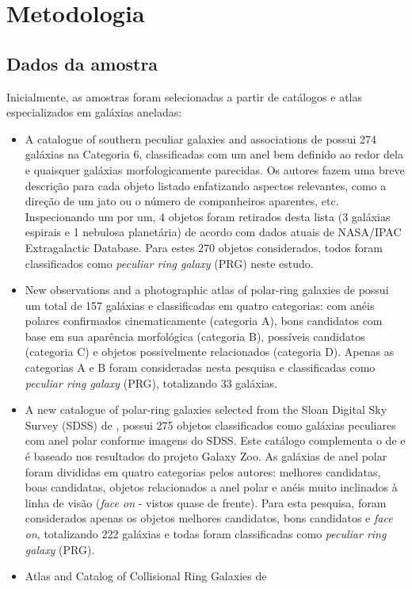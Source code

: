 \chapter{Metodologia}

\section{Dados da amostra}

Inicialmente, as amostras foram selecionadas a partir de catálogos e atlas especializados em galáxias aneladas:

\begin{itemize}
    \item A catalogue of southern peculiar galaxies and associations de  possui 274 galáxias na Categoria 6, classificadas com um anel bem definido ao redor dela e quaisquer galáxias morfologicamente parecidas. Os autores fazem uma breve descrição para cada objeto listado enfatizando aspectos relevantes, como a direção de um jato ou o número de companheiros aparentes, etc. Inspecionando um por um, 4 objetos foram retirados desta lista (3 galáxias espirais e 1 nebulosa planetária) de acordo com dados atuais de NASA/IPAC Extragalactic Database. Para estes 270 objetos considerados, todos foram classificados como \emph{peculiar ring galaxy} (PRG) neste estudo.
    \item New observations and a photographic atlas of polar-ring galaxies de  possui um total de 157 galáxias e classificadas em quatro categorias: com anéis polares confirmados cinematicamente (categoria A), bons candidatos com base em sua aparência morfológica (categoria B), possíveis candidatos (categoria C) e objetos possivelmente relacionados (categoria D). Apenas as categorias A e B foram consideradas nesta pesquisa e classificadas como \emph{peculiar ring galaxy} (PRG), totalizando 33 galáxias.
    \item A new catalogue of polar-ring galaxies selected from the Sloan Digital Sky Survey (SDSS) de , possui 275 objetos classificados como galáxias peculiares com anel polar conforme imagens do SDSS. Este catálogo complementa o de  e é baseado nos resultados do projeto Galaxy Zoo. As galáxias de anel polar foram divididas em quatro categorias pelos autores: melhores candidatas, boas candidatas, objetos relacionados a anel polar e anéis muito inclinados à linha de visão (\emph{face on} - vistos quase de frente). Para esta pesquisa, foram considerados apenas os objetos melhores candidatos, bons candidatos e \emph{face on}, totalizando 222 galáxias e todas foram classificadas como \emph{peculiar ring galaxy} (PRG).
    \item Atlas and Catalog of Collisional Ring Galaxies de 







\end{itemize}

